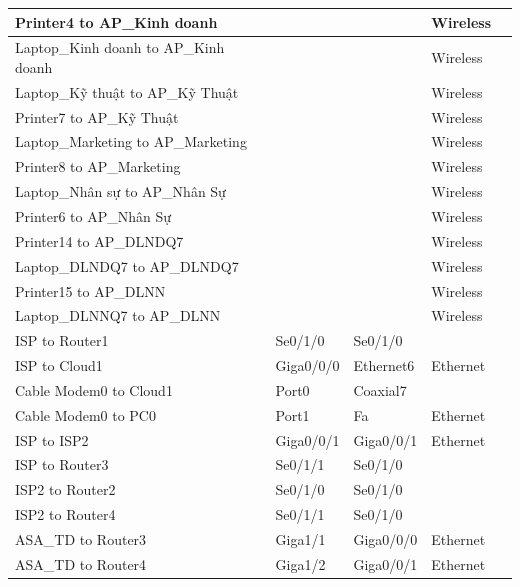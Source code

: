 \documentclass[a4paper, 12pt]{article}
\begin{document}
\begin{center}
\begin{longtable}{|p{}|p{}|p{}|p{}|p{}|}
\hline Printer4 to AP\_Kinh doanh     &         &        &  Wireless  &   \\
\hline Laptop\_Kinh doanh to AP\_Kinh doanh    &         &        &  Wireless  &   \\
\hline Laptop\_Kỹ thuật to AP\_Kỹ Thuật     &         &        &  Wireless  &   \\
\hline Printer7 to AP\_Kỹ Thuật     &         &        &  Wireless  &   \\
\hline Laptop\_Marketing to AP\_Marketing    &         &        &  Wireless  &   \\
\hline Printer8 to AP\_Marketing     &         &        &  Wireless  &   \\
\hline Laptop\_Nhân sự to AP\_Nhân Sự    &         &        &  Wireless  &   \\
\hline Printer6 to AP\_Nhân Sự     &         &        &  Wireless  &   \\
\hline Printer14 to AP\_DLNDQ7     &         &        &  Wireless  &   \\
\hline Laptop\_DLNDQ7 to AP\_DLNDQ7     &         &        &  Wireless  &   \\
\hline Printer15 to AP\_DLNN    &         &        &  Wireless  &   \\
\hline Laptop\_DLNNQ7 to AP\_DLNN   &         &        &  Wireless  &   \\
\hline ISP to Router1     &     Se0/1/0   &     Se0/1/0    &   &   \\
\hline ISP to Cloud1     &     Giga0/0/0    &     Ethernet6    &  Ethernet  &   \\
\hline Cable Modem0 to Cloud1     &     Port0     &     Coaxial7    &   &   \\
\hline Cable Modem0 to PC0      &     Port1     &     Fa    &  Ethernet  &   \\
\hline ISP to ISP2     &     Giga0/0/1     &     Giga0/0/1    &  Ethernet  &   \\
\hline ISP to Router3      &     Se0/1/1     &     Se0/1/0    &   &   \\
\hline ISP2 to Router2      &     Se0/1/0     &     Se0/1/0    &   &   \\
\hline ISP2 to Router4      &     Se0/1/1     &     Se0/1/0    &   &   \\
\hline ASA\_TD to Router3      &     Giga1/1     &     Giga0/0/0    &  Ethernet  &   \\
\hline ASA\_TD to Router4      &     Giga1/2     &     Giga0/0/1    &  Ethernet  &   \\

\end{longtable}
\end{center}
\end{document}

